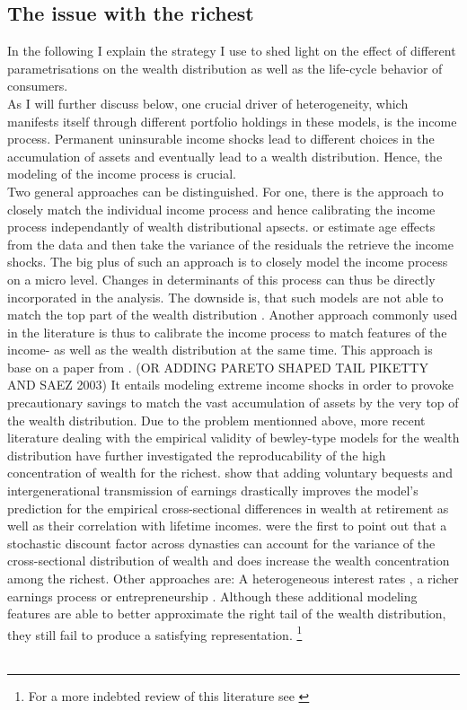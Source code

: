 \documentclass[a4paper,12pt]{article}
\begin{document}
\subsection{The issue with the richest}
In the following I explain the strategy I use to shed light on the effect of different parametrisations on the wealth distribution as well as the life-cycle behavior of consumers. \\ As I will further discuss below, one crucial driver of heterogeneity, which manifests itself through different portfolio holdings in these models, is the income process. Permanent uninsurable income shocks lead to different choices in the accumulation of assets and eventually lead to a wealth distribution. Hence, the modeling of the income process is crucial. \\ Two general approaches can be distinguished. For one, there is the approach to closely match the individual income process and hence calibrating the income process independantly of wealth distributional apsects. \cite{hintermaier2011} or \cite{hintermaier2016} estimate age effects from the data and then take the variance of the residuals the retrieve the income shocks. The big plus of such an approach is to closely model the income process on a micro level. Changes in determinants of this process can thus be directly incorporated in the analysis. The downside is, that such models are not able to match the top part of the wealth distribution \cite{denardi2017}. Another approach commonly used in the literature is thus to calibrate the income process to match features of the income- as well as the wealth distribution at the same time. This approach is base on a paper from \cite{castaneda2003}. (OR ADDING PARETO SHAPED TAIL PIKETTY AND SAEZ 2003) It entails modeling extreme income shocks in order to provoke precautionary savings to match the vast accumulation of assets by the very top of the wealth distribution. 
Due to the problem mentionned above, more recent literature dealing with the empirical validity of bewley-type models for the wealth distribution have further investigated the reproducability of the high concentration of wealth for the richest. \cite{denardi2014} show that adding voluntary bequests and intergenerational transmission of earnings drastically improves the model's prediction for the empirical cross-sectional differences in wealth at retirement as well as their correlation with lifetime incomes. \cite{krusell1998} were the first to point out that a stochastic discount factor across dynasties can account for the variance of the cross-sectional distribution of wealth and does increase the wealth concentration among the richest. Other approaches are: A heterogeneous interest rates \citep{benhabib2015}, a richer earnings process \citep{denardi2016}  or entrepreneurship \citep{cagetti2009}. Although these additional modeling features are able to better approximate the right tail of the wealth distribution, they still fail to produce a satisfying representation. \footnote{For a more indebted review of this literature see  \citep{denardi2017}} \\ \\
\end{document}
